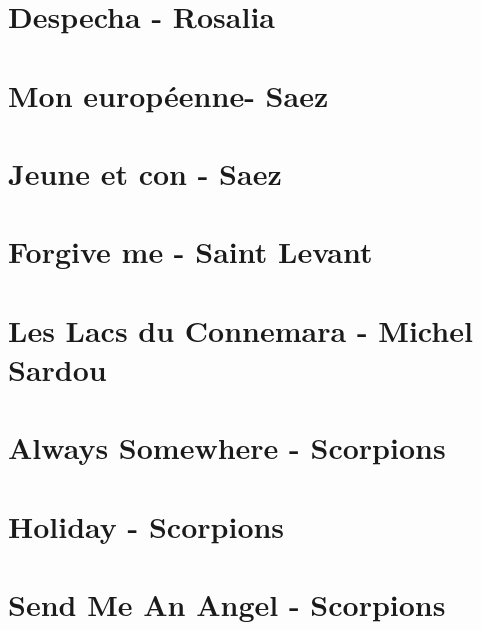 \documentclass[11pt]{article}
\begin{document}
\section{Despecha - Rosalia}
\begin{guitar}

\end{guitar}

\section{Mon européenne- Saez}
\begin{guitar}

\end{guitar}


\section{Jeune et con - Saez}
\begin{guitar}

\end{guitar}



\section{Forgive me - Saint Levant}



\section{Les Lacs du Connemara - Michel Sardou}
\begin{guitar}

\end{guitar}

\section*{Always Somewhere - Scorpions}
\begin{guitar}

\end{guitar}

\section*{Holiday - Scorpions}
\begin{guitar}

\end{guitar}

\section{Send Me An Angel - Scorpions}
\begin{guitar}

\end{guitar}
\end{document}
